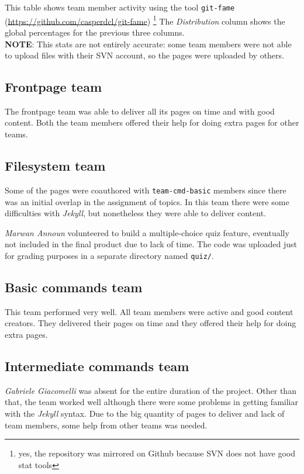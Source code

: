 \documentclass[hidelinks,12pt,a4paper,numbers=enddot]{scrartcl}
\begin{document}
This table shows team member activity using the tool \texttt{git-fame} (\url{https://github.com/casperdcl/git-fame})
\footnote{yes, the repository was mirrored on Github because SVN does not have good stat tools}
The \emph{Distribution} column shows the global percentages for the previous three columns. \\
\textbf{NOTE}: This stats are not entirely accurate: some team members were not able to upload files with their SVN account, so the pages were uploaded by others.

\subsection{Frontpage team}
The frontpage team was able to deliver all its pages on time and with good content. Both the team members offered their
help for doing extra pages for other teams.

\subsection{Filesystem team}
Some of the pages were coauthored with \texttt{team-cmd-basic} members since there was an initial overlap in the
assignment of topics. In this team there were some difficulties with \textit{Jekyll}, but nonetheless they were able
to deliver content.

\textit{Marwan Announ} volunteered to build a multiple-choice quiz feature, eventually not included in the final product
due to lack of time. The code was uploaded just for grading purposes in a separate directory named \texttt{quiz/}.

\subsection{Basic commands team}
This team performed very well. All team members were active and good content creators. They delivered their pages on time
and they offered their help for doing extra pages.

\subsection{Intermediate commands team}
\textit{Gabriele Giacomelli} was absent for the entire duration of the project. Other than that, the team worked well
although there were some problems in getting familiar with the \emph{Jekyll} syntax. Due to the big quantity of pages to
deliver and lack of team members, some help from other teams was needed.
\end{document}
